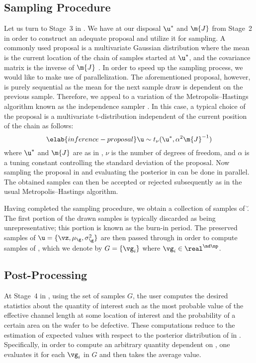 \subsection{Sampling Procedure}

Let us turn to Stage~3 in . We have at our disposal
$\u^*$ and $\m{J}$ from Stage~2 in order to construct an adequate proposal and
utilize it for sampling. A commonly used proposal is a multivariate Gaussian
distribution where the mean is the current location of the chain of samples
started at $\u^*$, and the covariance matrix is the inverse of $\m{J}$
\cite{gelman2004}. In order to speed up the sampling process, we would like to
make use of parallelization. The aforementioned proposal, however, is purely
sequential as the mean for the next sample draw is dependent on the previous
sample. Therefore, we appeal to a variation of the Metropolis--Hastings
algorithm known as the independence sampler \cite{gelman2004}. In this case, a
typical choice of the proposal is a multivariate t-distribution independent of
the current position of the chain as follows:
\begin{equation} \elab{inference-proposal}
  \u \sim t_\nu(\u^*, \alpha^2 \m{J}^{-1})
\end{equation}
where $\u^*$ and $\m{J}$ are as in , $\nu$ is the
number of degrees of freedom, and $\alpha$ is a tuning constant controlling the
standard deviation of the proposal. Now sampling the proposal in
 and evaluating the posterior in
 can be done in parallel. The obtained samples can
then be accepted or rejected subsequently as in the usual Metropolis--Hastings
algorithm.

Having completed the sampling procedure, we obtain a collection of samples of
\u. The first portion of the drawn samples is typically discarded as being
unrepresentative; this portion is known as the burn-in period. The preserved
samples of $\u = \{ \vz, \mu_\g, \sigma^2_\g \}$ are then passed through
 in order to compute samples of \g, which we denote by
$G = \{ \vg_i \}$ where $\vg_i \in \real^{\nd \np}$.

\subsection{Post-Processing}

At Stage~4 in , using the set of samples $G$, the user
computes the desired statistics about the quantity of interest such as the most
probable value of the effective channel length at some location of interest and
the probability of a certain area on the wafer to be defective. These
computations reduce to the estimation of expected values with respect to the
posterior distribution of \u in . Specifically, in
order to compute an arbitrary quantity dependent on \g, one evaluates it for
each $\vg_i$ in $G$ and then takes the average value.

